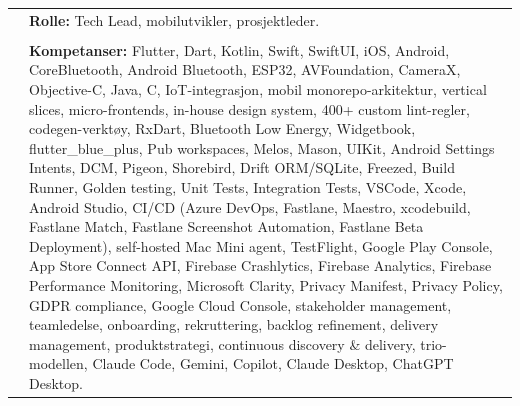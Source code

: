 \documentclass[a4paper,10pt]{article}
\begin{document}
\begin{longtable}{@{}p{4cm}p{11cm}@{}}
& \textbf{Rolle:} Tech Lead, mobilutvikler, prosjektleder. \\
& \\
& \textbf{Kompetanser:} Flutter, Dart, Kotlin, Swift, SwiftUI, iOS, Android, CoreBluetooth, Android Bluetooth, ESP32, AVFoundation, CameraX, Objective-C, Java, C, IoT-integrasjon, mobil monorepo-arkitektur, vertical slices, micro-frontends, in-house design system, 400+ custom lint-regler, codegen-verktøy, RxDart, Bluetooth Low Energy, Widgetbook, flutter\_blue\_plus, Pub workspaces, Melos, Mason, UIKit, Android Settings Intents, DCM, Pigeon, Shorebird, Drift ORM/SQLite, Freezed, Build Runner, Golden testing, Unit Tests, Integration Tests, VSCode, Xcode, Android Studio, CI/CD (Azure DevOps, Fastlane, Maestro, xcodebuild, Fastlane Match, Fastlane Screenshot Automation, Fastlane Beta Deployment), self-hosted Mac Mini agent, TestFlight, Google Play Console, App Store Connect API, Firebase Crashlytics, Firebase Analytics, Firebase Performance Monitoring, Microsoft Clarity, Privacy Manifest, Privacy Policy, GDPR compliance, Google Cloud Console, stakeholder management, teamledelse, onboarding, rekruttering, backlog refinement, delivery management, produktstrategi, continuous discovery \& delivery, trio-modellen, Claude Code, Gemini, Copilot, Claude Desktop, ChatGPT Desktop. \\
\end{longtable}

\vspace{2em}
\end{document}
